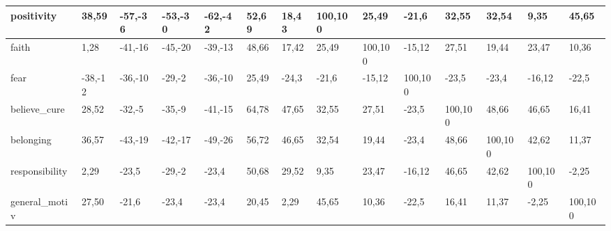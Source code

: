 \begin{table}[H]
\begin{adjustbox}{angle=270}
\begin{tabular} {|l|l|l|l|l|l|l|l|l|l|l|l|l|l|}
 \hline
 positivity & {\color{green}38,59} & {\color{red}-57,-36} & {\color{red}-53,-30} & {\color{red}-62,-42} & {\color{green}52,69} & {\color{green}18,43} & {\color{green}100,100} & {\color{green}25,49} & -21,6 & {\color{green}32,55} & {\color{green}32,54} & {\color{green}9,35} & {\color{green}45,65} \\
 \hline
 faith & {\color{green}1,28} & {\color{red}-41,-16} & {\color{red}-45,-20} & {\color{red}-39,-13} & {\color{green}48,66} & {\color{green}17,42} & {\color{green}25,49} & {\color{green}100,100} & -15,12 & {\color{green}27,51} & {\color{green}19,44} & {\color{green}23,47} & {\color{green}10,36} \\
 \hline
 fear & {\color{red}-38,-12} & {\color{red}-36,-10} & {\color{red}-29,-2} & {\color{red}-36,-10} & {\color{green}25,49} & -24,3 & -21,6 & -15,12 & {\color{green}100,100} & -23,5 & -23,4 & -16,12 & -22,5 \\
 \hline
 believe\_cure & {\color{green}28,52} & {\color{red}-32,-5} & {\color{red}-35,-9} & {\color{red}-41,-15} & {\color{green}64,78} & {\color{green}47,65} & {\color{green}32,55} & {\color{green}27,51} & -23,5 & {\color{green}100,100} & {\color{green}48,66} & {\color{green}46,65} & {\color{green}16,41} \\
 \hline
 belonging & {\color{green}36,57} & {\color{red}-43,-19} & {\color{red}-42,-17} & {\color{red}-49,-26} & {\color{green}56,72} & {\color{green}46,65} & {\color{green}32,54} & {\color{green}19,44} & -23,4 & {\color{green}48,66} & {\color{green}100,100} & {\color{green}42,62} & {\color{green}11,37} \\
 \hline
 responsibility & {\color{green}2,29} & -23,5 & {\color{red}-29,-2} & -23,4 & {\color{green}50,68} & {\color{green}29,52} & {\color{green}9,35} & {\color{green}23,47} & -16,12 & {\color{green}46,65} & {\color{green}42,62} & {\color{green}100,100} & -2,25 \\
 \hline
 general\_motiv & {\color{green}27,50} & -21,6 & -23,4 & -23,4 & {\color{green}20,45} & {\color{green}2,29} & {\color{green}45,65} & {\color{green}10,36} & -22,5 & {\color{green}16,41} & {\color{green}11,37} & -2,25 & {\color{green}100,100} \\
 \hline
 \hline
 \end{tabular}
\end{adjustbox}
\end{table}
